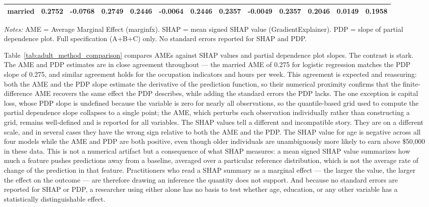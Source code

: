 \documentclass[conference]{IEEEtran}
\begin{document}
\begin{table}[htbp]
\begin{threeparttable}
\begin{tabular}{lrrrrrrrrrrrr}
				married & 0.2752 & -0.0768 & 0.2749 & 0.2446 & -0.0064 & 0.2446 & 0.2357 & -0.0049 & 0.2357 & 0.2046 & 0.0149 & 0.1958 \\
				\bottomrule
			\end{tabular}
			\begin{tablenotes}
				\footnotesize
				\item \textit{Notes:} AME = Average Marginal Effect (marginfx). SHAP = mean signed SHAP value (GradientExplainer). PDP = slope of partial dependence plot. Full specification (A+B+C) only. No standard errors reported for SHAP and PDP.
			\end{tablenotes}
		\end{threeparttable}
	\end{table}
	
	Table~\ref{tab:adult_method_comparison} compares AMEs against SHAP values and partial dependence plot slopes. The contrast is stark. The AME and PDP estimates are in close agreement throughout --- the married AME of 0.275 for logistic regression matches the PDP slope of 0.275, and similar agreement holds for the occupation indicators and hours per week. This agreement is expected and reassuring: both the AME and the PDP slope estimate the derivative of the prediction function, so their numerical proximity confirms that the finite-difference AME recovers the same effect the PDP describes, while adding the standard errors the PDP lacks. The one exception is capital loss, whose PDP slope is undefined because the variable is zero for nearly all observations, so the quantile-based grid used to compute the partial dependence slope collapses to a single point; the AME, which perturbs each observation individually rather than constructing a grid, remains well-defined and is reported for all variables. The SHAP values tell a different and incompatible story. They are on a different scale, and in several cases they have the wrong sign relative to both the AME and the PDP. The SHAP value for age is negative across all four models while the AME and PDP are both positive, even though older individuals are unambiguously more likely to earn above \$50{,}000 in these data. This is not a numerical artifact but a consequence of what SHAP measures: a mean signed SHAP value summarizes how much a feature pushes predictions away from a baseline, averaged over a particular reference distribution, which is not the average rate of change of the prediction in that feature. Practitioners who read a SHAP summary as a marginal effect --- the larger the value, the larger the effect on the outcome --- are therefore drawing an inference the quantity does not support. And because no standard errors are reported for SHAP or PDP, a researcher using either alone has no basis to test whether age, education, or any other variable has a statistically distinguishable effect.
	
\end{document}
